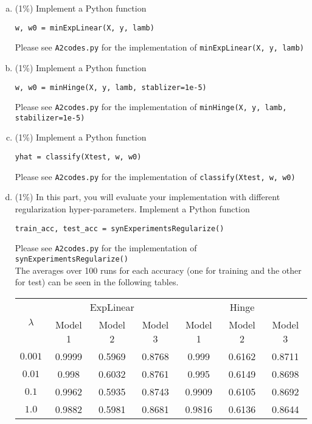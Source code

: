 \documentclass[12pt]{article}
\begin{document}
\begin{enumerate}[(a)]
  \item (1\%) Implement a Python function 
    \begin{center}
      \texttt{w, w0 = minExpLinear(X, y, lamb)}
    \end{center}
    Please see \texttt{A2codes.py} for the implementation of \texttt{minExpLinear(X, y, lamb)}
  \item (1\%) Implement a Python function
    \begin{center}
      \texttt{w, w0 = minHinge(X, y, lamb, stablizer=1e-5)}
    \end{center}
    Please see \texttt{A2codes.py} for the implementation of \texttt{minHinge(X, y, lamb, stabilizer=1e-5)}
  \item (1\%) Implement a Python function 
    \begin{center}
      \texttt{yhat = classify(Xtest, w, w0)}\\
    \end{center}
    Please see \texttt{A2codes.py} for the implementation of \texttt{classify(Xtest, w, w0)}
  \item (1\%) In this part, you will evaluate your implementation with different regularization hyper-parameters. Implement a Python function 
    \begin{center}
      \texttt{train\_acc, test\_acc = synExperimentsRegularize()}
    \end{center}
    Please see \texttt{A2codes.py} for the implementation of \texttt{synExperimentsRegularize()} \\
    The averages over 100 runs for each accuracy (one for training and the other for test) can be seen in the following tables. 
    \begin{table}[H]
      \centering
      \begin{tabular}{|c|c|c|c|c|c|c|}
        \hline
        \multirow{2}{25mm}{\centering$\lambda$} & \multicolumn{3}{|c|}{ExpLinear} & \multicolumn{3}{|c|}{Hinge} \\ 
        \cline{2-7}
        & Model 1 & Model 2 & Model 3 & Model 1 & Model 2 & Model 3 \\ 
        \hline
        $0.001$ & 0.9999 & 0.5969 & 0.8768 & 0.999 & 0.6162 & 0.8711\\ 
        $0.01$ & 0.998 & 0.6032 & 0.8761 & 0.995 & 0.6149 & 0.8698\\ 
        $0.1$ & 0.9962 & 0.5935 & 0.8743 & 0.9909 & 0.6105 & 0.8692\\ 
        $1.0$ & 0.9882 & 0.5981 & 0.8681 & 0.9816 & 0.6136 & 0.8644\\ 

\end{tabular}
\end{table}
\end{enumerate}
\end{document}
